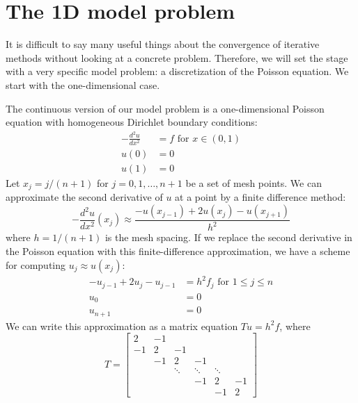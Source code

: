 \section{The 1D model problem}

It is difficult to say many useful
things about the convergence of iterative methods without looking at a
concrete problem.  Therefore, we will set the stage with a very
specific model problem: a discretization of the Poisson equation.
We start with the one-dimensional case.

The continuous version of our model problem is a one-dimensional
Poisson equation with homogeneous Dirichlet boundary conditions:
\begin{align*}
  -\frac{d^2 u}{dx^2} &= f \mbox{ for } x \in (0,1) \\
  u(0) & = 0 \\
  u(1) & = 0
\end{align*}
Let $x_j = j/(n+1)$ for $j = 0, 1, \ldots, n+1$ be a set of mesh points.
We can approximate the second derivative of $u$ at a point by
a finite difference method:
\[
  -\frac{d^2 u}{dx^2}(x_j) \approx
    \frac{-u(x_{j-1})+2u(x_j)-u(x_{j+1})}{h^2}
\]
where $h = 1/(n+1)$ is the mesh spacing.  If we replace the second
derivative in the Poisson equation with this finite-difference approximation,
we have a scheme for computing $u_j \approx u(x_j)$:
\begin{align*}
  -u_{j-1} + 2u_j - u_{j-1} &= h^2 f_j \mbox{ for } 1 \leq j \leq n \\
  u_0 & = 0 \\
  u_{n+1} & = 0
\end{align*}
We can write this approximation as a matrix equation $Tu = h^2 f$, where
\[
  T = \begin{bmatrix}
      2 & -1 \\
      -1 & 2 & -1 \\
         & -1 & 2 & -1 \\
         &    & \ddots & \ddots & \ddots \\
         &    &        & -1 & 2      & -1 \\
         &    &        &    & -1      & 2
      \end{bmatrix}
\]

